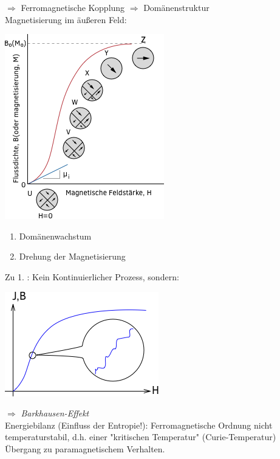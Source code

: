 $ \Rightarrow $ Ferromagnetische Kopplung $ \Rightarrow $ Domänenstruktur\\ \break
Magnetisierung im äußeren Feld:
\begin{center}
	\includegraphics[width=0.5\linewidth]{skizzen/17/17B09}
\end{center}

\begin{enumerate}
	\item Domänenwachstum
	\item Drehung der Magnetisierung
\end{enumerate}

Zu 1. : Kein Kontinuierlicher Prozess, sondern:

\begin{center}
	\includegraphics[width=0.5\linewidth]{skizzen/17/17B10}
\end{center}
$ \Rightarrow $ \emph{Barkhausen-Effekt} \\ \break
Energiebilanz (Einfluss der Entropie!): Ferromagnetische Ordnung nicht temperaturstabil, d.h. einer "kritischen Temperatur" (Curie-Temperatur) Übergang zu paramagnetischem Verhalten.\\ \break

